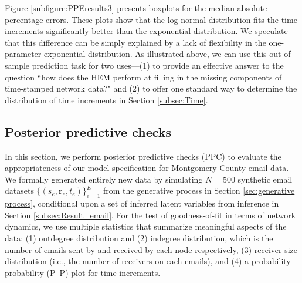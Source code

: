 \documentclass[ba]{imsart}
\def\spacingset#1{\renewcommand{\baselinestretch}%
	{#1}\small\normalsize} \spacingset{1}
\numberwithin{equation}{section}
\theoremstyle{plain}
\begin{document}
	Figure \ref{subfigure:PPEresults3} presents boxplots for the median absolute percentage errors. These plots show that the log-normal distribution fits the time increments significantly better than the exponential distribution. We speculate that this difference can be simply explained by a lack of flexibility in the one-parameter exponential distribution. As illustrated above, we can use this out-of-sample prediction task for two uses---(1) to provide an effective answer to the question ``how does the HEM perform at filling in the missing components of time-stamped network data?" and (2) to offer one standard way to determine the distribution of time increments in Section \ref{subsec:Time}. 
	
	\subsection{Posterior predictive checks}\label{subsec:PPC_email} 	   
	In this section, we perform posterior predictive checks (PPC) \citep{rubin1984bayesianly} to evaluate the appropriateness of our model specification for Montgomery County email data. We formally generated entirely new data by simulating $N=500$ synthetic email datasets $\{(s_{e}, \boldsymbol{r}_{e}, t_{e})\}_{e=1}^E$ from the generative process in Section \ref{sec:generative process}, conditional upon a set of inferred latent variables from inference in Section \ref{subsec:Result_email}. For the test of goodness-of-fit in terms of network dynamics, we use multiple statistics that summarize meaningful aspects of the data: (1) outdegree distribution and (2) indegree distribution, which is the number of emails sent by and received by each node respectively, (3) receiver size distribution (i.e., the number of receivers on each emails), and (4) a probability--probability (P--P) plot for time increments. 

\end{document}
